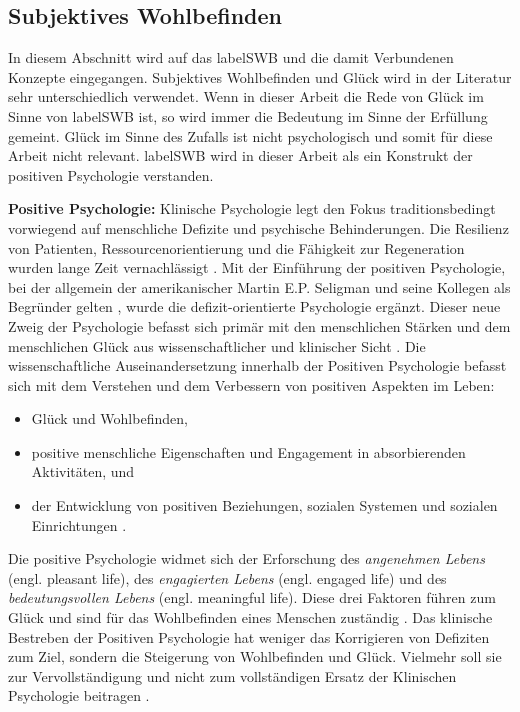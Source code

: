 \subsection{Subjektives Wohlbefinden}\label{subsection.subjektivesWohlbefinden}
In diesem Abschnitt wird auf das \gls{labelSWB} und die damit Verbundenen Konzepte eingegangen. Subjektives Wohlbefinden und Glück wird in der Literatur sehr unterschiedlich verwendet. Wenn in dieser Arbeit die Rede von Glück im Sinne von \gls{labelSWB} ist, so wird immer die Bedeutung im Sinne der Erfüllung gemeint. Glück im Sinne des Zufalls ist nicht psychologisch und somit für diese Arbeit nicht relevant. \Gls{labelSWB} wird in dieser Arbeit als ein Konstrukt der positiven Psychologie verstanden. 
\par
\textbf{Positive Psychologie:} 
Klinische Psychologie legt den Fokus traditionsbedingt vorwiegend auf menschliche Defizite und psychische Behinderungen. Die Resilienz von Patienten, Ressourcenorientierung und die Fähigkeit zur Regeneration wurden lange Zeit vernachlässigt \cite{Carr2011}. Mit der Einführung der positiven Psychologie, bei der allgemein der amerikanischer Martin E.P. Seligman und seine Kollegen als Begründer gelten \cite{Seligman2003}, wurde die defizit-orientierte Psychologie ergänzt. Dieser neue Zweig der Psychologie befasst sich primär mit den menschlichen Stärken und dem menschlichen Glück aus wissenschaftlicher und klinischer Sicht \cite{Carr2011}. Die wissenschaftliche Auseinandersetzung innerhalb der Positiven Psychologie befasst sich mit dem Verstehen und dem Verbessern von positiven Aspekten im Leben:
\begin{itemize}
    \item Glück und Wohlbefinden,
    \item positive menschliche Eigenschaften und Engagement in absorbierenden Aktivitäten, und
    \item der Entwicklung von positiven Beziehungen, sozialen Systemen und sozialen Einrichtungen \cite{Lopez2009, Seligman2003}.
\end{itemize}
Die positive Psychologie widmet sich der Erforschung des \textit{angenehmen Lebens} (engl. pleasant life), des \textit{engagierten Lebens} (engl. engaged life) und des \textit{bedeutungsvollen Lebens} (engl. meaningful life). Diese drei Faktoren führen zum Glück und sind für das Wohlbefinden eines Menschen zuständig \cite{Peterson2005}. Das klinische Bestreben der Positiven Psychologie hat weniger das Korrigieren von Defiziten zum Ziel, sondern die Steigerung von Wohlbefinden und Glück. Vielmehr soll sie zur Vervollständigung und nicht zum vollständigen Ersatz der Klinischen Psychologie beitragen \cite{Carr2011}.
